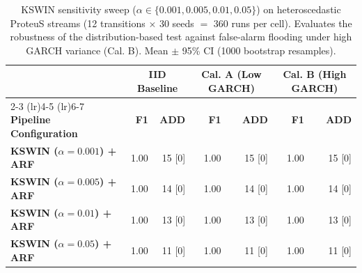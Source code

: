 \begin{table}[t]
  \centering
  \caption{KSWIN sensitivity sweep ($\alpha \in \{0.001, 0.005, 0.01, 0.05\}$) on heteroscedastic ProteuS streams (12 transitions $\times$ 30 seeds $=$ 360 runs per cell). Evaluates the robustness of the distribution-based test against false-alarm flooding under high GARCH variance (Cal. B). Mean $\pm$ 95\% CI (1000 bootstrap resamples).}
  \label{tab:kswin_alpha_sweep}
  \begin{tabular}{@{}lrrrrrr@{}}
    \toprule
                                                   & \multicolumn{2}{c}{\textbf{IID Baseline}} & \multicolumn{2}{c}{\textbf{Cal. A (Low GARCH)}} & \multicolumn{2}{c}{\textbf{Cal. B (High GARCH)}} \\
    \cmidrule(lr){2-3} \cmidrule(lr){4-5} \cmidrule(lr){6-7}
    \textbf{Pipeline Configuration}                & \textbf{F1} & \textbf{ADD} & \textbf{F1} & \textbf{ADD} & \textbf{F1} & \textbf{ADD} \\
    \midrule
    \textbf{KSWIN ($\alpha = 0.001$) + ARF}        & 1.00 & 15 [0] & 1.00 & 15 [0] & 1.00 & 15 [0] \\
    \textbf{KSWIN ($\alpha = 0.005$) + ARF}        & 1.00 & 14 [0] & 1.00 & 14 [0] & 1.00 & 14 [0] \\
    \textbf{KSWIN ($\alpha = 0.01$) + ARF}         & 1.00 & 13 [0] & 1.00 & 13 [0] & 1.00 & 13 [0] \\
    \textbf{KSWIN ($\alpha = 0.05$) + ARF}         & 1.00 & 11 [0] & 1.00 & 11 [0] & 1.00 & 11 [0] \\
    \bottomrule
  \end{tabular}
\end{table}

